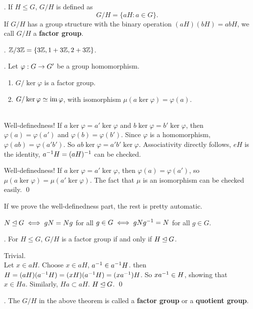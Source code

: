 .  If \(H \leq G\), \(G/H\) is defined as
\[
    G/H = \{aH : a \in G\}.
\]
If \(G/H\) has a group structure with the binary operation \((aH)(bH) = abH\), we call \(G/H\) a \textbf{factor group}.

\ex. \(\mathbb{Z} / 3\mathbb{Z} = \{3\mathbb{Z}, 1 + 3\mathbb{Z}, 2 + 3\mathbb{Z}\}\).

\thm. Let \(\varphi : G \rightarrow G'\) be a group homomorphism.
\begin{enumerate}
    \item \(G / \ker\varphi\) is a factor group.
    \item {} \(G / \ker\varphi \simeq \operatorname{im} \varphi\), with isomorphism \(\mu(a \ker\varphi) = \varphi(a)\).
\end{enumerate}

\pf \\
 Well-definedness! If \(a \ker\varphi = a' \ker\varphi\) and \(b \ker\varphi = b' \ker\varphi\), then \(\varphi(a) = \varphi(a')\) and \(\varphi(b) = \varphi(b')\). Since \(\varphi\) is a homomorphism, \(\varphi(ab) = \varphi(a'b')\). So \(ab \ker\varphi = a'b' \ker\varphi\). Associativity directly follows, \(eH\) is the identity, \(a^{-1} H = (aH)^{-1}\) can be checked.

 Well-definedness! If \(a \ker\varphi = a' \ker\varphi\), then \(\varphi(a) = \varphi(a')\), so \(\mu(a \ker\varphi) = \mu(a' \ker\varphi)\). The fact that \(\mu\) is an isomorphism can be checked easily. \qed

If we prove the well-definedness part, the rest is pretty automatic.

\recall \(N \unlhd G \iff gN = Ng\) for all \(g \in G \iff gNg^{-1} = N\) for all \(g \in G\).

\thm. For \(H \leq G\), \(G/H\) is a factor group if and only if \(H \unlhd G\).

\pf \note{\mimpd} Trivial. \\
\note{\mimp} Let \(x \in aH\). Choose \(x \in aH\), \(a^{-1} \in a^{-1} H\). then \(H = (aH)(a^{-1} H) = (xH)(a^{-1} H) = (xa^{-1}) H\). So \(xa^{-1} \in H\), showing that \(x \in Ha\). Similarly, \(Ha \subset aH\). \(H \unlhd G\). \qed

. The \(G / H\) in the above theorem is called a \textbf{factor group} or a \textbf{quotient group}.

\pagebreak
